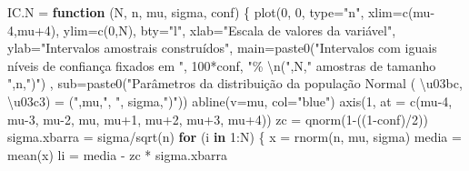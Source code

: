 \documentclass[
]{book}
\newenvironment{Shaded}{\begin{snugshade}}{\end{snugshade}}
\newcommand{\AttributeTok}[1]{\textcolor[rgb]{0.77,0.63,0.00}{#1}}
\newcommand{\ControlFlowTok}[1]{\textcolor[rgb]{0.13,0.29,0.53}{\textbf{#1}}}
\newcommand{\DecValTok}[1]{\textcolor[rgb]{0.00,0.00,0.81}{#1}}
\newcommand{\FunctionTok}[1]{\textcolor[rgb]{0.00,0.00,0.00}{#1}}
\newcommand{\NormalTok}[1]{#1}
\newcommand{\OtherTok}[1]{\textcolor[rgb]{0.56,0.35,0.01}{#1}}
\newcommand{\SpecialCharTok}[1]{\textcolor[rgb]{0.00,0.00,0.00}{#1}}
\newcommand{\StringTok}[1]{\textcolor[rgb]{0.31,0.60,0.02}{#1}}
\begin{document}
\begin{Shaded}
\begin{Highlighting}[]
\NormalTok{IC.N }\OtherTok{=} \ControlFlowTok{function}\NormalTok{ (N, n, mu, sigma, conf) \{}
  \FunctionTok{plot}\NormalTok{(}\DecValTok{0}\NormalTok{, }\DecValTok{0}\NormalTok{, }
       \AttributeTok{type=}\StringTok{"n"}\NormalTok{, }
       \AttributeTok{xlim=}\FunctionTok{c}\NormalTok{(mu}\DecValTok{{-}4}\NormalTok{,mu}\SpecialCharTok{+}\DecValTok{4}\NormalTok{), }
       \AttributeTok{ylim=}\FunctionTok{c}\NormalTok{(}\DecValTok{0}\NormalTok{,N), }
       \AttributeTok{bty=}\StringTok{"l"}\NormalTok{,}
       \AttributeTok{xlab=}\StringTok{"Escala de valores da variável"}\NormalTok{, }
       \AttributeTok{ylab=}\StringTok{"Intervalos amostrais construídos"}\NormalTok{, }
       \AttributeTok{main=}\FunctionTok{paste0}\NormalTok{(}\StringTok{"Intervalos com iguais níveis de confiança fixados em "}\NormalTok{, }\DecValTok{100}\SpecialCharTok{*}\NormalTok{conf, }\StringTok{"\% }\SpecialCharTok{\textbackslash{}n}\StringTok{("}\NormalTok{,N,}\StringTok{" amostras de tamanho "}\NormalTok{,n,}\StringTok{")"}\NormalTok{) , }
       \AttributeTok{sub=}\FunctionTok{paste0}\NormalTok{(}\StringTok{"Parâmetros da distribuição da população Normal ( \textbackslash{}u03bc, \textbackslash{}u03c3) = ("}\NormalTok{,mu,}\StringTok{", "}\NormalTok{, sigma,}\StringTok{")"}\NormalTok{))}
  \FunctionTok{abline}\NormalTok{(}\AttributeTok{v=}\NormalTok{mu, }\AttributeTok{col=}\StringTok{"blue"}\NormalTok{)}
  \FunctionTok{axis}\NormalTok{(}\DecValTok{1}\NormalTok{, }\AttributeTok{at =} \FunctionTok{c}\NormalTok{(mu}\DecValTok{{-}4}\NormalTok{, mu}\DecValTok{{-}3}\NormalTok{, mu}\DecValTok{{-}2}\NormalTok{, mu, mu}\SpecialCharTok{+}\DecValTok{1}\NormalTok{, mu}\SpecialCharTok{+}\DecValTok{2}\NormalTok{, mu}\SpecialCharTok{+}\DecValTok{3}\NormalTok{, mu}\SpecialCharTok{+}\DecValTok{4}\NormalTok{))}
\NormalTok{zc }\OtherTok{=} \FunctionTok{qnorm}\NormalTok{(}\DecValTok{1}\SpecialCharTok{{-}}\NormalTok{((}\DecValTok{1}\SpecialCharTok{{-}}\NormalTok{conf)}\SpecialCharTok{/}\DecValTok{2}\NormalTok{))}
\NormalTok{sigma.xbarra }\OtherTok{=}\NormalTok{ sigma}\SpecialCharTok{/}\FunctionTok{sqrt}\NormalTok{(n)}
\ControlFlowTok{for}\NormalTok{ (i }\ControlFlowTok{in} \DecValTok{1}\SpecialCharTok{:}\NormalTok{N) \{}
\NormalTok{  x }\OtherTok{=} \FunctionTok{rnorm}\NormalTok{(n, mu, sigma)}
\NormalTok{  media }\OtherTok{=} \FunctionTok{mean}\NormalTok{(x)}
\NormalTok{  li }\OtherTok{=}\NormalTok{ media }\SpecialCharTok{{-}}\NormalTok{ zc }\SpecialCharTok{*}\NormalTok{ sigma.xbarra}

\end{Highlighting}
\end{Shaded}
\end{document}

